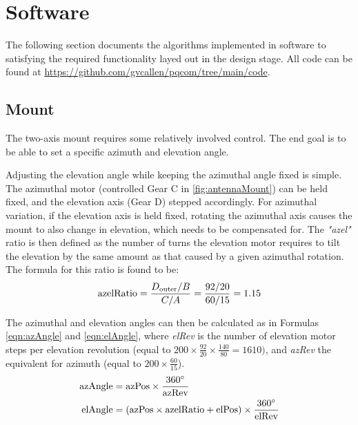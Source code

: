 \section{Software}

The following section documents the algorithms implemented in software to satisfying the required functionality layed out in the design stage. All code can be found at \url{https://github.com/gvcallen/pqcom/tree/main/code}.

\subsection{Mount}
The two-axis mount requires some relatively involved control. The end goal is to be able to set a specific azimuth and elevation angle.

Adjusting the elevation angle while keeping the azimuthal angle fixed is simple. The azimuthal motor (controlled Gear C in \ref{fig:antennaMount}) can be held fixed, and the elevation axis (Gear D) stepped accordingly. For azimuthal variation, if the elevation axis is held fixed, rotating the azimuthal axis causes the mount to also change in elevation, which needs to be compensated for. The \textit{"azel"} ratio is then defined as the number of turns the elevation motor requires to tilt the elevation by the same amount as that caused by a given azimuthal rotation. The formula for this ratio is found to be:
\begin{equation}\label{eqn:azelRatio}
\textnormal{azelRatio} = \frac{D_{\textnormal{outer}} / B}{C / A} = \frac{92 / 20}{60 / 15} = 1.15
\end{equation}

\noindent The azimuthal and elevation angles can then be calculated as in Formulas \ref{eqn:azAngle} and \ref{eqn:elAngle}, where \textit{elRev} is the number of elevation motor steps per elevation revolution (equal to $200 \times \frac{92}{20} \times \frac{140}{80} = 1610)$, and \textit{azRev} the equivalent for azimuth (equal to $200 \times \frac{60}{15}$).
\begin{align}
    \textnormal{azAngle} &= \textnormal{azPos} \times \frac{360 ^{\circ}}{\textnormal{azRev}} \label{eqn:azAngle} \\
    \textnormal{elAngle} &= (\textnormal{azPos} \times \textnormal{azelRatio} + \textnormal{elPos}) \times \frac{360 ^{\circ}}{\textnormal{elRev}} \label{eqn:elAngle}
\end{align}

